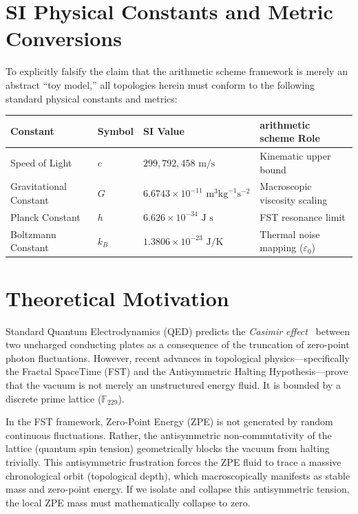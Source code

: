 \section*{SI Physical Constants and Metric Conversions}
To explicitly falsify the claim that the arithmetic scheme framework is merely an abstract ``toy model,'' all topologies herein must conform to the following standard physical constants and metrics:
\begin{table}[ht]
\centering
\renewcommand{\arraystretch}{1.2}
\begin{tabular}{@{}llll@{}}
\toprule
\textbf{Constant} & \textbf{Symbol} & \textbf{SI Value} & \textbf{arithmetic scheme Role} \\
\midrule
Speed of Light & $c$ & $299,792,458 \text{ m/s}$ & Kinematic upper bound \\
Gravitational Constant & $G$ & $6.6743 \times 10^{-11} \text{ m}^3 \text{kg}^{-1} \text{s}^{-2}$ & Macroscopic viscosity scaling \\
Planck Constant & $h$ & $6.626 \times 10^{-34} \text{ J s}$ & FST resonance limit \\
Boltzmann Constant & $k_B$ & $1.3806 \times 10^{-23} \text{ J/K}$ & Thermal noise mapping ($\varepsilon_0$) \\
\bottomrule
\end{tabular}
\end{table}

\section{Theoretical Motivation}\label{sec:theory}

Standard Quantum Electrodynamics (QED) predicts the \emph{Casimir effect}~\cite{Casimir1948} between two uncharged conducting plates as a consequence of the truncation of zero-point photon fluctuations. However, recent advances in topological physics---specifically the Fractal SpaceTime (FST) and the Antisymmetric Halting Hypothesis---prove that the vacuum is not merely an unstructured energy fluid. It is bounded by a discrete prime lattice ($\mathbb{F}_{229}$).

In the FST framework, Zero-Point Energy (ZPE) is not generated by random continuous fluctuations. Rather, the antisymmetric non-commutativity of the lattice (quantum spin tension) geometrically blocks the vacuum from halting trivially. This antisymmetric frustration forces the ZPE fluid to trace a massive chronological orbit (topological depth), which macroscopically manifests as stable mass and zero-point energy. If we isolate and collapse this antisymmetric tension, the local ZPE mass must mathematically collapse to zero.

